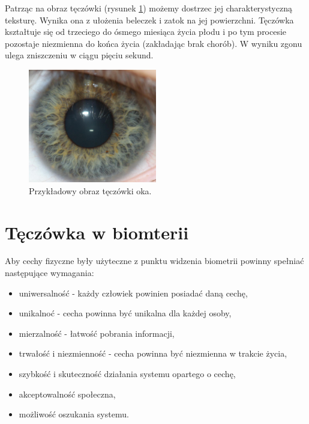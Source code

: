 Patrząc na obraz tęczówki (rysunek \ref{fig:irisExample}) możemy dostrzec jej charakterystyczną teksturę. Wynika ona z ułożenia
beleczek i zatok na jej powierzchni. Tęczówka kształtuje się od trzeciego do ósmego miesiąca życia
płodu i po tym procesie pozostaje niezmienna do końca życia (zakładając brak chorób).
W wyniku zgonu ulega zniszczeniu w ciągu pięciu sekund.

\begin{figure}[ht]
  \centering
  \includegraphics[width=0.5\textwidth]{images/intro/irisExample.png}
  \caption{Przykładowy obraz tęczówki oka.}
  \label{fig:irisExample}
\end{figure}

\section{Tęczówka w biomterii}

Aby cechy fizyczne były użyteczne z punktu widzenia biometrii powinny spełnia\'c następujące
wymagania:

\begin{itemize}
  \item uniwersalnoś\'c - każdy człowiek powinien posiada\'c daną cechę,
  \item unikalno\'c - cecha powinna by\'c unikalna dla każdej osoby,
  \item mierzalnoś\'c - łatwoś\'c pobrania informacji,
  \item trwałoś\'c i niezmiennoś\'c - cecha powinna by\'c niezmienna w trakcie życia,
  \item szybkoś\'c i skutecznoś\'c działania systemu opartego o cechę,
  \item akceptowalnoś\'c społeczna,
  \item możliwoś\'c oszukania systemu.
\end{itemize}

